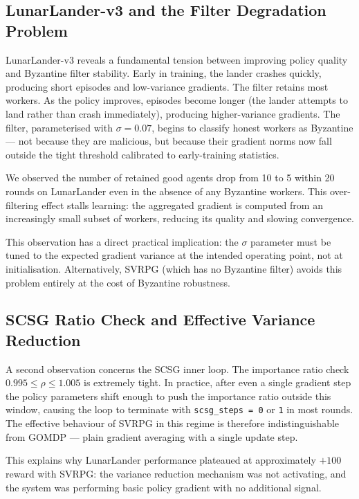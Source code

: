 \subsection{LunarLander-v3 and the Filter Degradation Problem}

LunarLander-v3 reveals a fundamental tension between improving policy quality
and Byzantine filter stability. Early in training, the lander crashes quickly,
producing short episodes and low-variance gradients. The filter retains most
workers. As the policy improves, episodes become longer (the lander attempts
to land rather than crash immediately), producing higher-variance gradients.
The filter, parameterised with $\sigma = 0.07$, begins to classify honest
workers as Byzantine --- not because they are malicious, but because their
gradient norms now fall outside the tight threshold calibrated to early-training
statistics.

We observed the number of retained good agents drop from 10 to 5 within 20
rounds on LunarLander even in the absence of any Byzantine workers. This
over-filtering effect stalls learning: the aggregated gradient is computed from
an increasingly small subset of workers, reducing its quality and slowing
convergence.

This observation has a direct practical implication: the $\sigma$ parameter
must be tuned to the expected gradient variance at the intended operating point,
not at initialisation. Alternatively, SVRPG (which has no Byzantine filter)
avoids this problem entirely at the cost of Byzantine robustness.

\subsection{SCSG Ratio Check and Effective Variance Reduction}

A second observation concerns the SCSG inner loop. The importance ratio check
$0.995 \le \rho \le 1.005$ is extremely tight. In practice, after even a single
gradient step the policy parameters shift enough to push the importance ratio
outside this window, causing the loop to terminate with \texttt{scsg\_steps = 0}
or \texttt{1} in most rounds. The effective behaviour of SVRPG in this regime
is therefore indistinguishable from GOMDP --- plain gradient averaging with a
single update step.

This explains why LunarLander performance plateaued at approximately $+100$
reward with SVRPG: the variance reduction mechanism was not activating, and the
system was performing basic policy gradient with no additional signal.

